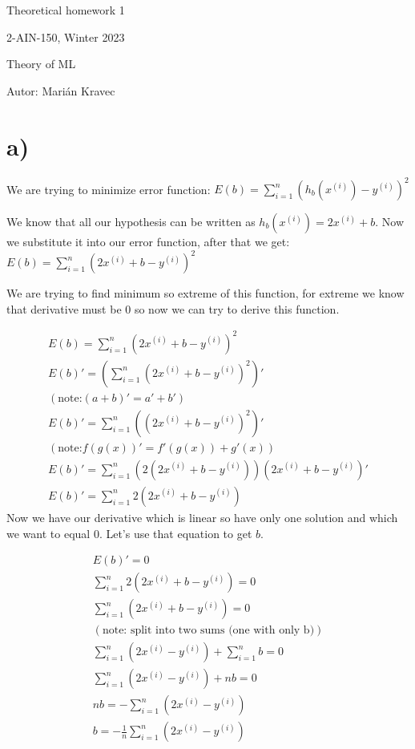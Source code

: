 \documentclass[a4paper]{article}
\begin{document}
 
	
\pagestyle{plain}

\begin{center}
	\sc\large
	Theoretical homework 1
	
	2-AIN-150, Winter 2023
	
	Theory of ML
\end{center}

Autor: Marián Kravec

\section{a)}

We are trying to minimize error function: $E(b)=\sum_{i=1}^{n}(h_b(x^{(i)}) - y^{(i)})^2$

We know that all our hypothesis can be written as $h_b(x^{(i)}) = 2x^{(i)}+b$. Now we substitute it into our error function, after that we get: $E(b)=\sum_{i=1}^{n}(2x^{(i)}+b - y^{(i)})^2$
 
We are trying to find minimum so extreme of this function, for extreme we know that derivative must be $0$ so now we can try to derive this function.

\begin{align*}
	E(b)=\sum_{i=1}^{n}(2x^{(i)}+b - y^{(i)})^2 
	\\
	E(b)'=(\sum_{i=1}^{n}(2x^{(i)}+b - y^{(i)})^2)'  
	\\
	(\text{note:} (a+b)'=a'+b')
	\\
	E(b)'=\sum_{i=1}^{n}((2x^{(i)}+b - y^{(i)})^2)'
	\\
	(\text{note:} f(g(x))'=f'(g(x))+g'(x))
	\\
	E(b)'=\sum_{i=1}^{n}(2(2x^{(i)}+b - y^{(i)}))(2x^{(i)}+b - y^{(i)})'
	\\
	E(b)'=\sum_{i=1}^{n}2(2x^{(i)}+b - y^{(i)})
\end{align*} 
Now we have our derivative which is linear so have only one solution and which we want to equal $0$. Let's use that equation to get $b$.

\begin{align*}
	E(b)'=0
	\\
	\sum_{i=1}^{n}2(2x^{(i)}+b - y^{(i)})=0
	\\
	\sum_{i=1}^{n}(2x^{(i)}+b - y^{(i)})=0
	\\
	(\text{note: split into two sums (one with only b)})
	\\
	\sum_{i=1}^{n}(2x^{(i)} - y^{(i)}) + \sum_{i=1}^{n}b=0
	\\
	\sum_{i=1}^{n}(2x^{(i)} - y^{(i)}) + nb=0
	\\
	nb = -\sum_{i=1}^{n}(2x^{(i)} - y^{(i)}) 
	\\
	b = - \frac{1}{n}\sum_{i=1}^{n}(2x^{(i)} - y^{(i)})
\end{align*} 
\end{document}

